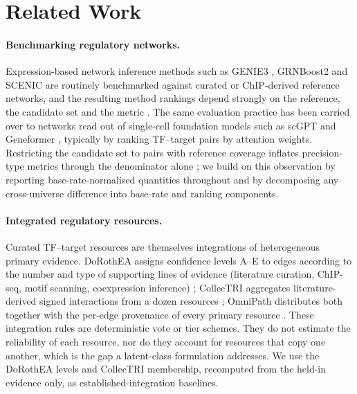 \documentclass[11pt,a4paper]{article}
\begin{document}
\section{Related Work}\label{sec:related}

\paragraph{Benchmarking regulatory networks.}
Expression-based network inference methods such as GENIE3 \citep{huynh2010inferring}, GRNBoost2 \citep{moerman2019grnboost2} and SCENIC \citep{aibar2017scenic} are routinely benchmarked against curated or ChIP-derived reference networks, and the resulting method rankings depend strongly on the reference, the candidate set and the metric \citep{pratapa2020benchmarking}.
The same evaluation practice has been carried over to networks read out of single-cell foundation models such as scGPT \citep{cui2024scgpt} and Geneformer \citep{theodoris2023transfer}, typically by ranking TF--target pairs by attention weights.
Restricting the candidate set to pairs with reference coverage inflates precision-type metrics through the denominator alone \citep{kendiukhov2025universe}; we build on this observation by reporting base-rate-normalised quantities throughout and by decomposing any cross-universe difference into base-rate and ranking components.

\paragraph{Integrated regulatory resources.}
Curated TF--target resources are themselves integrations of heterogeneous primary evidence. DoRothEA assigns confidence levels A--E to edges according to the number and type of supporting lines of evidence (literature curation, ChIP-seq, motif scanning, coexpression inference) \citep{garcia2019benchmark}; CollecTRI aggregates literature-derived signed interactions from a dozen resources \citep{mullerdott2023collectri}; OmniPath distributes both together with the per-edge provenance of every primary resource \citep{turei2021omnipath}.
These integration rules are deterministic vote or tier schemes. They do not estimate the reliability of each resource, nor do they account for resources that copy one another, which is the gap a latent-class formulation addresses. We use the DoRothEA levels and CollecTRI membership, recomputed from the held-in evidence only, as established-integration baselines.
\end{document}
